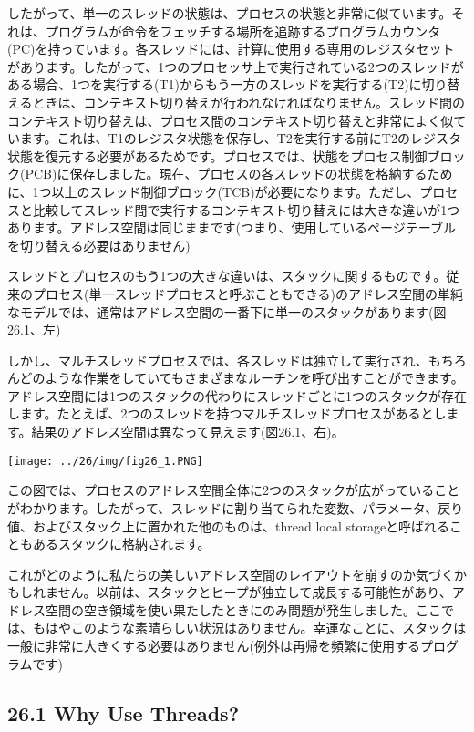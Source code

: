 したがって、単一のスレッドの状態は、プロセスの状態と非常に似ています。それは、プログラムが命令をフェッチする場所を追跡するプログラムカウンタ(PC)を持っています。各スレッドには、計算に使用する専用のレジスタセットがあります。したがって、1つのプロセッサ上で実行されている2つのスレッドがある場合、1つを実行する(T1)からもう一方のスレッドを実行する(T2)に切り替えるときは、コンテキスト切り替えが行われなければなりません。スレッド間のコンテキスト切り替えは、プロセス間のコンテキスト切り替えと非常によく似ています。これは、T1のレジスタ状態を保存し、T2を実行する前にT2のレジスタ状態を復元する必要があるためです。プロセスでは、状態をプロセス制御ブロック(PCB)に保存しました。現在、プロセスの各スレッドの状態を格納するために、1つ以上のスレッド制御ブロック(TCB)が必要になります。ただし、プロセスと比較してスレッド間で実行するコンテキスト切り替えには大きな違いが1つあります。アドレス空間は同じままです(つまり、使用しているページテーブルを切り替える必要はありません)

スレッドとプロセスのもう1つの大きな違いは、スタックに関するものです。従来のプロセス(単一スレッドプロセスと呼ぶこともできる)のアドレス空間の単純なモデルでは、通常はアドレス空間の一番下に単一のスタックがあります(図26.1、左)

しかし、マルチスレッドプロセスでは、各スレッドは独立して実行され、もちろんどのような作業をしていてもさまざまなルーチンを呼び出すことができます。アドレス空間には1つのスタックの代わりにスレッドごとに1つのスタックが存在します。たとえば、2つのスレッドを持つマルチスレッドプロセスがあるとします。結果のアドレス空間は異なって見えます(図26.1、右)。

\texttt{[image: ../26/img/fig26\_1.PNG]}

この図では、プロセスのアドレス空間全体に2つのスタックが広がっていることがわかります。したがって、スレッドに割り当てられた変数、パラメータ、戻り値、およびスタック上に置かれた他のものは、thread
local storageと呼ばれることもあるスタックに格納されます。

これがどのように私たちの美しいアドレス空間のレイアウトを崩すのか気づくかもしれません。以前は、スタックとヒープが独立して成長する可能性があり、アドレス空間の空き領域を使い果たしたときにのみ問題が発生しました。ここでは、もはやこのような素晴らしい状況はありません。幸運なことに、スタックは一般に非常に大きくする必要はありません(例外は再帰を頻繁に使用するプログラムです)

\hypertarget{why-use-threads}{%
\subsection*{26.1 Why Use Threads?}\label{why-use-threads}}


